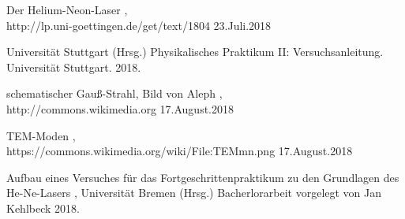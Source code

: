 \documentclass[10pt,twoside]{article}
\renewcommand{\1}{^{-1}}
\renewcommand{\2}{^{-2}}
\newcommand{\3}{^{-3}}
\newcommand{\4}{^{-4}}
\newcommand{\5}{^{-5}}
\newcommand{\6}{^{-6}}
\newcommand{\7}{^{-7}}
\newcommand{\8}{^{-8}}
\newcommand{\9}{^{-9}}
\begin{document}
\renewcommand{\refname}{\textbf{Literaturverzeichnis}}
\begin{thebibliography}{xxxxxxxxxxxxxxx}

\glqq Der Helium-Neon-Laser \grqq ,\\
http://lp.uni-goettingen.de/get/text/1804
 	23.Juli.2018
 	
 	
Universität Stuttgart (Hrsg.) Physikalisches Praktikum II: Versuchsanleitung. Universität Stuttgart.
2018.

\glqq schematischer Gauß-Strahl, Bild von Aleph \grqq ,\\
http://commons.wikimedia.org
 	17.August.2018
	
\glqq TEM-Moden \grqq ,\\
https://commons.wikimedia.org/wiki/File:TEMmn.png	
 	17.August.2018		
		 
\glqq Aufbau eines Versuches für das Fortgeschrittenpraktikum zu den Grundlagen des He-Ne-Lasers \grqq ,
Universität Bremen (Hrsg.) Bacherlorarbeit vorgelegt von Jan Kehlbeck
2018.

		 
		 
\end{thebibliography}
\end{document}
